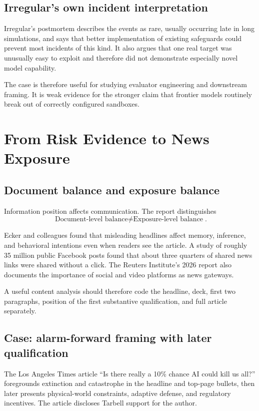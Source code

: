 \documentclass[11pt,twoside]{article}
\begin{document}
\subsection{Irregular's own incident interpretation}
Irregular's postmortem describes the events as rare, usually occurring late in long simulations, and says that better implementation of existing safeguards could prevent most incidents of this kind. It also argues that one real target was unusually easy to exploit and therefore did not demonstrate especially novel model capability.

The case is therefore useful for studying evaluator engineering and downstream framing. It is weak evidence for the stronger claim that frontier models routinely break out of correctly configured sandboxes.

\section{From Risk Evidence to News Exposure}
\subsection{Document balance and exposure balance}
Information position affects communication. The report distinguishes
\[
\boxed{\text{Document-level balance}\neq\text{Exposure-level balance}}.
\]

Ecker and colleagues found that misleading headlines affect memory, inference, and behavioral intentions even when readers see the article. A study of roughly 35 million public Facebook posts found that about three quarters of shared news links were shared without a click. The Reuters Institute's 2026 report also documents the importance of social and video platforms as news gateways.

A useful content analysis should therefore code the headline, deck, first two paragraphs, position of the first substantive qualification, and full article separately.

\subsection{Case: alarm-forward framing with later qualification}
The Los Angeles Times article ``Is there really a 10\% chance AI could kill us all?'' foregrounds extinction and catastrophe in the headline and top-page bullets, then later presents physical-world constraints, adaptive defense, and regulatory incentives. The article discloses Tarbell support for the author.
\end{document}
